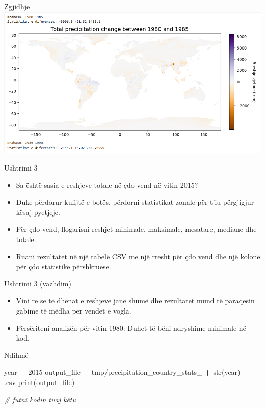 \documentclass[
  ignorenonframetext,
]{beamer}
\newenvironment{Shaded}{\begin{snugshade}}{\end{snugshade}}
\newcommand{\BuiltInTok}[1]{#1}
\newcommand{\CommentTok}[1]{\textcolor[rgb]{0.56,0.35,0.01}{\textit{#1}}}
\newcommand{\DecValTok}[1]{\textcolor[rgb]{0.00,0.00,0.81}{#1}}
\newcommand{\NormalTok}[1]{#1}
\newcommand{\OperatorTok}[1]{\textcolor[rgb]{0.81,0.36,0.00}{\textbf{#1}}}
\newcommand{\StringTok}[1]{\textcolor[rgb]{0.31,0.60,0.02}{#1}}
\begin{document}
\begin{frame}{Zgjidhje}
\protect\hypertarget{zgjidhje-4}{}
\includegraphics{./Figs/krahasim.png}
\end{frame}

\begin{frame}{Ushtrimi 3}
\protect\hypertarget{ushtrimi-3}{}
\begin{itemize}
\item
  Sa është sasia e reshjeve totale në çdo vend në vitin 2015?
\item
  Duke përdorur kufijtë e botës, përdorni statistikat zonale për t'iu
  përgjigjur kësaj pyetjeje.
\item
  Për çdo vend, llogarisni reshjet minimale, maksimale, mesatare,
  mediane dhe totale.
\item
  Ruani rezultatet në një tabelë CSV me një rresht për çdo vend dhe një
  kolonë për çdo statistikë përshkruese.
\end{itemize}
\end{frame}

\begin{frame}{Ushtrimi 3 (vazhdim)}
\protect\hypertarget{ushtrimi-3-vazhdim}{}
\begin{itemize}
\item
  Vini re se të dhënat e reshjeve janë shumë dhe rezultatet mund të
  paraqesin gabime të mëdha për vendet e vogla.
\item
  Përsëriteni analizën për vitin 1980: Duhet të bëni ndryshime minimale
  në kod.
\end{itemize}
\end{frame}

\begin{frame}[fragile]{Ndihmë}
\protect\hypertarget{ndihmuxeb-1}{}

\begin{Shaded}
\begin{Highlighting}[]
\NormalTok{year }\OperatorTok{=} \DecValTok{2015}
\NormalTok{output\_file }\OperatorTok{=} \StringTok{\textquotesingle{}tmp/precipitation\_country\_stats\_\textquotesingle{}} \OperatorTok{+} \BuiltInTok{str}\NormalTok{(year) }\OperatorTok{+} \StringTok{\textquotesingle{}.csv\textquotesingle{}}
\BuiltInTok{print}\NormalTok{(output\_file)}

\CommentTok{\# futni kodin tuaj këtu}
\end{Highlighting}
\end{Shaded}
\end{frame}
\end{document}
